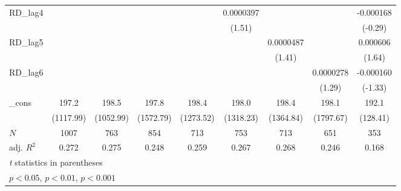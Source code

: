 {\begin{tabular}{l*{8}{c}}
\addlinespace
RD\_lag4     &                     &                     &                     &                     &   0.0000397         &                     &                     &   -0.000168         \\
            &                     &                     &                     &                     &      (1.51)         &                     &                     &     (-0.29)         \\
\addlinespace
RD\_lag5     &                     &                     &                     &                     &                     &   0.0000487         &                     &    0.000606         \\
            &                     &                     &                     &                     &                     &      (1.41)         &                     &      (1.64)         \\
\addlinespace
RD\_lag6     &                     &                     &                     &                     &                     &                     &   0.0000278         &   -0.000160         \\
            &                     &                     &                     &                     &                     &                     &      (1.29)         &     (-1.33)         \\
\addlinespace
\_cons      &       197.2\sym{***}&       198.5\sym{***}&       197.8\sym{***}&       198.4\sym{***}&       198.0\sym{***}&       198.4\sym{***}&       198.1\sym{***}&       192.1\sym{***}\\
            &   (1117.99)         &   (1052.99)         &   (1572.79)         &   (1273.52)         &   (1318.23)         &   (1364.84)         &   (1797.67)         &    (128.41)         \\
\midrule
\(N\)       &        1007         &         763         &         854         &         713         &         753         &         713         &         651         &         353         \\
adj. \(R^{2}\)&       0.272         &       0.275         &       0.248         &       0.259         &       0.267         &       0.268         &       0.246         &       0.168         \\
\bottomrule
\multicolumn{9}{l}{\footnotesize \textit{t} statistics in parentheses}\\
\multicolumn{9}{l}{\footnotesize \sym{*} \(p<0.05\), \sym{**} \(p<0.01\), \sym{***} \(p<0.001\)}\\
\end{tabular}
}
